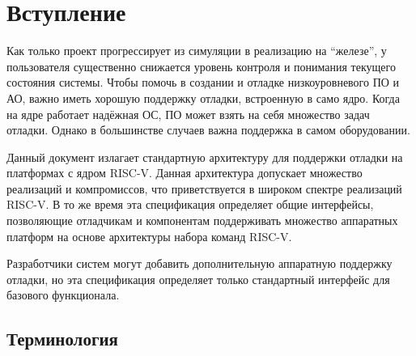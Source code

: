 \chapter{Вступление}
\label{sec:intro}

Как только проект прогрессирует из симуляции в реализацию на ``железе'', у пользователя
существенно снижается уровень контроля и понимания текущего состояния системы.
Чтобы помочь в создании и отладке низкоуровневого ПО и АО,
важно иметь хорошую поддержку отладки, встроенную в само ядро.
Когда на ядре работает надёжная ОС, ПО может взять на себя множество
задач отладки. Однако в большинстве случаев важна поддержка в самом оборудовании.

Данный документ излагает стандартную архитектуру для поддержки отладки
на платформах с ядром RISC-V. Данная архитектура допускает множество реализаций и
компромиссов, что приветствуется в широком спектре реализаций RISC-V.
В то же время эта спецификация определяет общие интерфейсы, позволяющие
отладчикам и компонентам поддерживать множество аппаратных платформ
на основе архитектуры набора команд RISC-V.

Разработчики систем могут добавить дополнительную аппаратную поддержку отладки,
но эта спецификация определяет только стандартный интерфейс для базового
функционала.

\section{Терминология}

